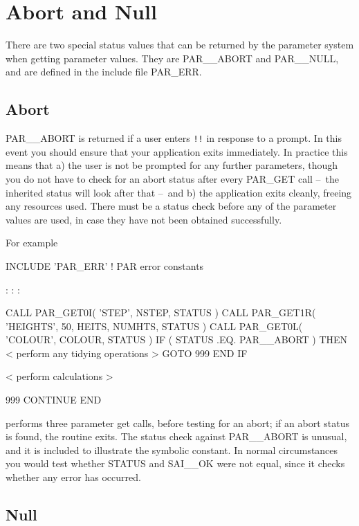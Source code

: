 \documentclass[twoside,11pt,nolof]{starlink}
\providecommand{\dash}{--}
\begin{document}
\section{Abort and Null}

There are two special status values that can be returned by the parameter
system when getting parameter values.  They are PAR\_\_ABORT and
PAR\_\_NULL, and are defined in the include file PAR\_ERR.

\subsection{Abort}

PAR\_\_ABORT is returned if a user enters \texttt{!!} in response to a
prompt.  In this event you should ensure that your application exits
immediately.  In practice this means that a) the user is not be prompted
for any further parameters, though you do not have to check for an abort
status after every PAR\_GET call \dash\ the inherited status will look after
that \dash\ and b) the application exits cleanly, freeing any resources used.
There must be a status check before any of the parameter values are
used, in case they have not been obtained successfully.

For example
\begin{terminalv}
      INCLUDE 'PAR_ERR'       ! PAR error constants

          :       :       :

      CALL PAR_GET0I( 'STEP', NSTEP, STATUS )
      CALL PAR_GET1R( 'HEIGHTS', 50, HEITS, NUMHTS, STATUS )
      CALL PAR_GET0L( 'COLOUR', COLOUR, STATUS )
      IF ( STATUS .EQ. PAR__ABORT ) THEN
         < perform any tidying operations >
         GOTO 999
      END IF

      < perform calculations >

  999 CONTINUE
      END
\end{terminalv}
performs three parameter get calls, before testing for an
abort; if an abort status is found, the routine exits.  The status check
against PAR\_\_ABORT is unusual, and it is included to illustrate the
symbolic constant.  In normal circumstances you would test whether
STATUS and SAI\_\_OK were not equal, since it checks whether any error
has occurred.

\subsection{Null}
\end{document}
